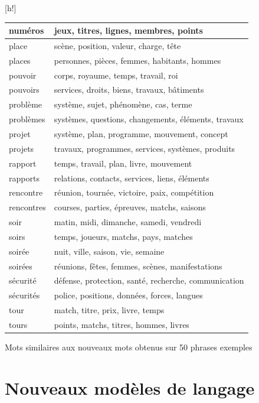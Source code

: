 \documentclass{style/these}
\makeatletter
\renewcommand\familydefault{ptm}
\newenvironment{aTable}%
  {%
   \renewcommand{\familydefault}{lmtt}\selectfont
  \@float{table}}
  {\end@float}
\makeatother
\begin{document}
\begin{part}
\begin{aTable}[h!]
\begin{tabular}{|l|l|}
numéros 	& jeux, titres, lignes, membres, points			\\ \hline
place 		& scène, position, valeur, charge, tête			\\ \hline
places  	& personnes, pièces, femmes, habitants, hommes		\\ \hline
pouvoir  	& corps, royaume, temps, travail, roi			\\ \hline
pouvoirs  	& services, droits, biens, travaux, bâtiments		\\ \hline
problème  	& système, sujet, phénomène, cas, terme			\\ \hline
problèmes  	& systèmes, questions, changements, éléments, travaux	\\ \hline
projet  	& système, plan, programme, mouvement, 	concept		\\ \hline
projets  	& travaux, programmes, services, systèmes, produits 	\\ \hline
rapport  	& temps, travail, plan, livre, mouvement		\\ \hline
rapports  	& relations, contacts, services, liens, éléments	\\ \hline
rencontre  	& réunion, tournée, victoire, paix, compétition		\\ \hline
rencontres  	& courses, parties, épreuves, matchs, saisons		\\ \hline
soir 		& matin, midi, dimanche, samedi, vendredi		\\ \hline
soirs  		& temps, joueurs, matchs, pays, matches			\\ \hline
soirée  	& nuit, ville, saison, vie, semaine			\\ \hline
soirées  	& réunions, fêtes, femmes, scènes, manifestations	\\ \hline
sécurité  	& défense, protection, santé, recherche, communication	\\ \hline
sécurités  	& police, positions, données, forces, langues		\\ \hline
tour 	 	& match, titre, prix, livre, temps			\\ \hline
tours  		& points, matchs, titres, hommes, livres		\\ \hline
\end{tabular}
\caption{Mots similaires aux nouveaux mots obtenus sur 50 phrases exemples}
\label{Tab:SWords-50}
\end{aTable}

\chapter{Nouveaux modèles de langage}
\renewcommand{\rightmark}{Nouveaux modèles de langage}
\renewcommand{\leftmark}{Annexe E}


\end{part}
\end{document}
